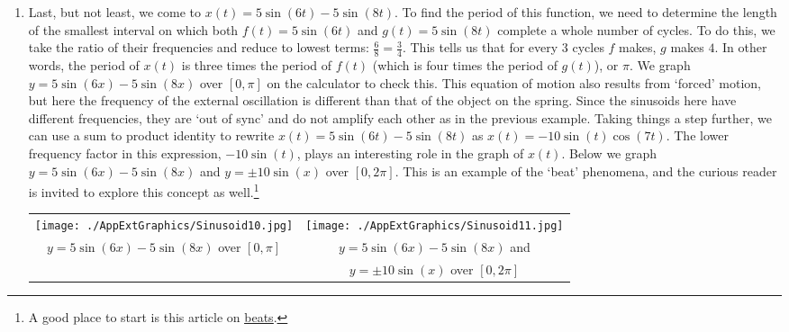 \begin{ex}
\begin{enumerate}
\begin{center}
\begin{tabular}{cc}
\end{tabular}

\end{center}

\vspace{-.1in}

\item Last, but not least, we come to  $x(t) = 5\sin(6t) - 5\sin(8t)$.  To find the period of this function, we need to determine the length of the smallest interval on which both $f(t) = 5\sin(6t)$ and $g(t) = 5\sin(8t)$ complete a whole number of cycles.  To do this, we take the ratio of their frequencies and reduce to lowest terms:  $\frac{6}{8} = \frac{3}{4}$.  This tells us that for every $3$ cycles $f$ makes, $g$ makes $4$. In other words, the period of $x(t)$ is three times the period of $f(t)$ (which is four times the period of $g(t)$), or $\pi$.  We graph $y = 5\sin(6x) - 5\sin(8x)$ over $[0,\pi]$ on the calculator to check this.  This equation of motion also results from `forced' motion, but here the frequency of the external oscillation is different than that of the object on the spring.  Since the sinusoids here have different frequencies, they are `out of sync' and  do not amplify each other as in the previous example.  Taking things a step further, we can use a sum to product identity to rewrite $x(t) = 5\sin(6t) - 5\sin(8t)$ as $x(t) = -10 \sin(t) \cos(7t)$.  The lower frequency factor in this expression,  $-10\sin(t)$, plays an interesting role in the graph of $x(t)$.  Below we graph $y = 5\sin(6x) - 5\sin(8x)$ and $y = \pm 10 \sin(x)$ over $[0,2\pi]$.  This is an example of the `beat' phenomena, and the curious reader is invited to explore this concept as well.\footnote{A good place to start is this article on \href{http://en.wikipedia.org/wiki/Beat_(acoustics)}{\underline{beats}}.}

\enlargethispage{.2in}

\begin{center}

\begin{tabular}{cc}

\texttt{[image: ./AppExtGraphics/Sinusoid10.jpg]} &
\hspace{0.5in} \texttt{[image: ./AppExtGraphics/Sinusoid11.jpg]}  \\
$y = 5\sin(6x) - 5\sin(8x)$ over $[0,\pi]$ & 
\hspace{0.5in} $y = 5\sin(6x) - 5\sin(8x)$ and \\
 & \hspace{0.5in} $y = \pm 10 \sin(x)$ over $[0,2\pi]$\\

\end{tabular}

\end{center}

\end{enumerate}

\end{ex}

